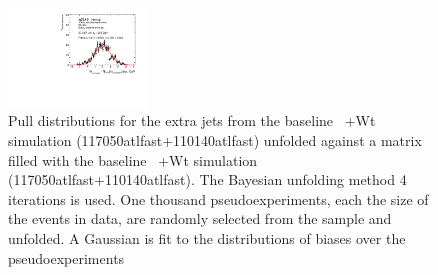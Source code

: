 \begin{figure}
\includegraphics[width=0.33\textwidth]{fig/UnfoldPull/SingleSlicePull40.pdf}
%
\caption{Pull distributions for the extra jets from the baseline \ttbar\ +Wt simulation (117050atlfast+110140atlfast) unfolded against a matrix filled with the baseline \ttbar\ +Wt simulation (117050atlfast+110140atlfast). The Bayesian unfolding method 4 iterations is used. One thousand pseudoexperiments, each the size of the events in data, are randomly selected from the sample and unfolded.  A Gaussian is fit to the distributions of biases over the pseudoexperiments}
\label{fig:appPull2}
\end{figure}
\clearpage
